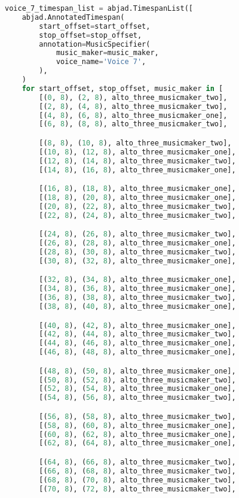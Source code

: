 \begin{lstlisting}[language=Python, caption=Invocation Source Code]
voice_7_timespan_list = abjad.TimespanList([
    abjad.AnnotatedTimespan(
        start_offset=start_offset,
        stop_offset=stop_offset,
        annotation=MusicSpecifier(
            music_maker=music_maker,
            voice_name='Voice 7',
        ),
    )
    for start_offset, stop_offset, music_maker in [
        [(0, 8), (2, 8), alto_three_musicmaker_two],
        [(2, 8), (4, 8), alto_three_musicmaker_two],
        [(4, 8), (6, 8), alto_three_musicmaker_one],
        [(6, 8), (8, 8), alto_three_musicmaker_two],

        [(8, 8), (10, 8), alto_three_musicmaker_two],
        [(10, 8), (12, 8), alto_three_musicmaker_one],
        [(12, 8), (14, 8), alto_three_musicmaker_two],
        [(14, 8), (16, 8), alto_three_musicmaker_one],

        [(16, 8), (18, 8), alto_three_musicmaker_one],
        [(18, 8), (20, 8), alto_three_musicmaker_one],
        [(20, 8), (22, 8), alto_three_musicmaker_two],
        [(22, 8), (24, 8), alto_three_musicmaker_two],

        [(24, 8), (26, 8), alto_three_musicmaker_two],
        [(26, 8), (28, 8), alto_three_musicmaker_one],
        [(28, 8), (30, 8), alto_three_musicmaker_two],
        [(30, 8), (32, 8), alto_three_musicmaker_one],

        [(32, 8), (34, 8), alto_three_musicmaker_one],
        [(34, 8), (36, 8), alto_three_musicmaker_one],
        [(36, 8), (38, 8), alto_three_musicmaker_two],
        [(38, 8), (40, 8), alto_three_musicmaker_one],

        [(40, 8), (42, 8), alto_three_musicmaker_one],
        [(42, 8), (44, 8), alto_three_musicmaker_two],
        [(44, 8), (46, 8), alto_three_musicmaker_one],
        [(46, 8), (48, 8), alto_three_musicmaker_one],

        [(48, 8), (50, 8), alto_three_musicmaker_one],
        [(50, 8), (52, 8), alto_three_musicmaker_two],
        [(52, 8), (54, 8), alto_three_musicmaker_one],
        [(54, 8), (56, 8), alto_three_musicmaker_two],

        [(56, 8), (58, 8), alto_three_musicmaker_two],
        [(58, 8), (60, 8), alto_three_musicmaker_one],
        [(60, 8), (62, 8), alto_three_musicmaker_one],
        [(62, 8), (64, 8), alto_three_musicmaker_one],

        [(64, 8), (66, 8), alto_three_musicmaker_two],
        [(66, 8), (68, 8), alto_three_musicmaker_two],
        [(68, 8), (70, 8), alto_three_musicmaker_two],
        [(70, 8), (72, 8), alto_three_musicmaker_two],


\end{lstlisting}
